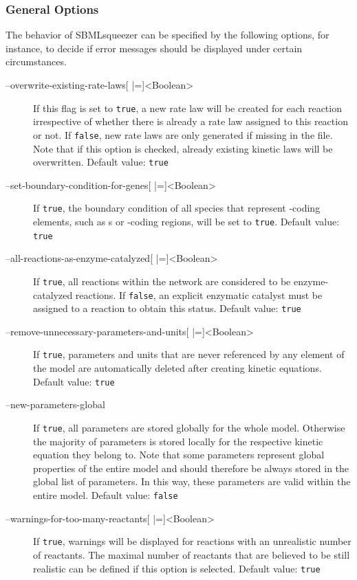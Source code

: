 \subsubsection{General Options}
The behavior of SBMLsqueezer can be specified by the following options, for
instance, to decide if error messages should be displayed under
certain circumstances.
\begin{description}
\item[--overwrite-existing-rate-laws{[} |={]}<Boolean>]
  If this flag is set to \texttt{true}, a new rate law will be created for
  each reaction irrespective of whether there is already a rate
  law assigned to this reaction or not. If \texttt{false}, new
  rate laws are only generated if missing in the \SBML file. Note
  that if this option is checked, already existing kinetic laws
  will be overwritten.
  Default value: \texttt{true}

\item[--set-boundary-condition-for-genes{[} |={]}<Boolean>]
  If \texttt{true}, the boundary condition of all species that
  represent {\gene}-coding elements, such as {\gene}s or {\gene}-coding
  regions, will be set to \texttt{true}.
  Default value: \texttt{true}

\item[--all-reactions-as-enzyme-catalyzed{[} |={]}<Boolean>]
  If \texttt{true}, all reactions within the network are considered to be
  enzyme-catalyzed reactions. If \texttt{false}, an explicit
  enzymatic catalyst must be assigned to a reaction to obtain
  this status.
  Default value: \texttt{true}

\item[--remove-unnecessary-parameters-and-units{[} |={]}<Boolean>]
  If \texttt{true}, parameters and units that are never referenced
  by any element of the model are automatically deleted after
  creating kinetic equations.
  Default value: \texttt{true}

\item[--new-parameters-global]
  If \texttt{true}, all parameters are stored globally for the
  whole model. Otherwise the majority of parameters is stored
  locally for the respective kinetic equation they belong to.
  Note that some parameters represent global properties of the
  entire model and should therefore be always stored in the global
  list of parameters. In this way, these parameters are valid within
  the entire model.
  Default value: \texttt{false}

\item[--warnings-for-too-many-reactants{[} |={]}<Boolean>]
  If \texttt{true}, warnings will be displayed for reactions with
  an unrealistic number of reactants. The maximal number of reactants
  that are believed to be still realistic can be defined if this
  option is selected.
  Default value: \texttt{true}


\end{description}
